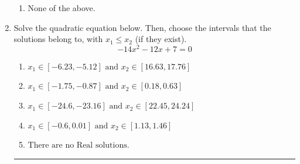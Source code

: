 \documentclass[14pt]{extbook}
\newcommand{\litem}[1]{\item#1\hspace*{-1cm}\rule{\textwidth}{0.4pt}}
\begin{document}
\begin{enumerate}
{\begin{enumerate}[label=\Alph*.]
\item None of the above.
\end{enumerate} }
\litem{
Solve the quadratic equation below. Then, choose the intervals that the solutions belong to, with $x_1 \leq x_2$ (if they exist).\[ -14x^{2} -12 x + 7 = 0 \]\begin{enumerate}[label=\Alph*.]
\item \( x_1 \in [-6.23, -5.12] \text{ and } x_2 \in [16.63, 17.76] \)
\item \( x_1 \in [-1.75, -0.87] \text{ and } x_2 \in [0.18, 0.63] \)
\item \( x_1 \in [-24.6, -23.16] \text{ and } x_2 \in [22.45, 24.24] \)
\item \( x_1 \in [-0.6, 0.01] \text{ and } x_2 \in [1.13, 1.46] \)
\item \( \text{There are no Real solutions.} \)


\end{enumerate}}
\end{enumerate}
\end{document}
